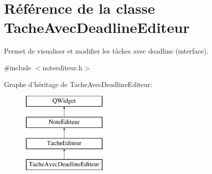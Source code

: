 \hypertarget{class_tache_avec_deadline_editeur}{\section{Référence de la classe Tache\-Avec\-Deadline\-Editeur}
\label{class_tache_avec_deadline_editeur}
}


Permet de visualiser et modifier les tâches avec deadline (interface).  




{\ttfamily \#include $<$noteediteur.\-h$>$}

Graphe d'héritage de Tache\-Avec\-Deadline\-Editeur\-:\begin{figure}[H]
\begin{center}
\leavevmode
\includegraphics[height=4.000000cm]{class_tache_avec_deadline_editeur}
\end{center}
\end{figure}
